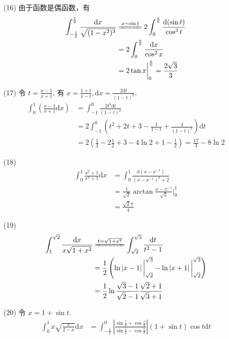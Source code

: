 \documentclass{article}
\newcommand{\dd}{\mathrm{d}}
\newcommand{\dx}{\dd x}
\newcommand{\dt}{\dd t}
\begin{document}
\begin{itemize}
    \item [(16)] 由于函数是偶函数，有
    \begin{align*}
        \int_{-\frac{1}{2}}^{\frac{1}{2}}\frac{\dx}{\sqrt{(1 - x^2)^3}} &\xlongequal[]{x = \sin t} 2\int_{0}^{\frac{\pi}{6}}\frac{\dd(\sin t)}{\cos^3 t} \\
        &= 2 \int_{0}^{\frac{\pi}{6}}\frac{\dx}{\cos^2 x}\\
        &= 2 \tan x \bigg|_{0}^{\frac{\pi}{6}} = \frac{2\sqrt{3}}{3}
    \end{align*}
    \item [(17)] 令 $t = \frac{x - 1}{x + 1}$, 有 $x = \frac{1 + t}{1 - t}, \dx = \frac{2\dt}{(1 - t)^2}$.
    \begin{align*}
        \int_{0}^{1}\left(\frac{x - 1}{x + 1}\dx\right) &= \int_{-1}^{0}\frac{2t^4\dt}{(1 - t)^2} \\
        &= 2\int_{-1}^{0}\left(t^2 + 2t + 3 - \frac{1}{1 - t} + \frac{4}{(1 - t)^2}\right)\dt \\
        &= 2\left(\frac{1}{3} - 2\frac{1}{2} + 3 - 4 \ln 2 + 1 - \frac{1}{2}\right) = \frac{17}{3} - 8 \ln 2
    \end{align*}
    \item [(18)] 
    \begin{align*}
        \int_{0}^{1}\frac{x^2 + 1}{x^4 + 1}\dx &= \int_{0}^{1}\frac{\dd (x - x^{-1})}{(x - x^{-1})^2 + 2} \\
        &= \frac{1}{\sqrt{2}}\arctan \frac{x - x^{-1}}{\sqrt{2}}\bigg|_0^1 \\
        &= \frac{\sqrt{2}\pi}{4}
    \end{align*}
    \item [(19)] 
    \begin{align*}
        \int_{1}^{\sqrt{2}}\frac{\dx}{x\sqrt{1 + x^2}} &\xlongequal[]{t = \sqrt{1 + x^2}} \int_{\sqrt{2}}^{\sqrt{3}}\frac{\dt}{t^2 - 1} \\
        &= \frac{1}{2}\left(\ln \left\lvert x - 1\right\rvert \bigg|_{\sqrt{2}}^{\sqrt{3}} - \ln \left\lvert x + 1\right\rvert \bigg|_{\sqrt{2}}^{\sqrt{3}}\right) \\
        &= \frac{1}{2}\ln \frac{\sqrt{3} - 1}{\sqrt{2} - 1}\frac{\sqrt{2} + 1}{\sqrt{3} + 1}
    \end{align*}
    \item [(20)] 令 $x = 1 + \sin t$.
    \begin{align*}
        \int_{0}^{1}x\sqrt{\frac{x}{2 - x}}\dx &= \int_{-\frac{\pi}{2}}^{0}\left\lvert \frac{\sin \frac{t}{2} + \cos \frac{t}{2}}{\sin \frac{t}{2} - \cos \frac{t}{2}}\right\rvert (1 + \sin t) \cos t \dt \\

\end{align*}
\end{itemize}
\end{document}
